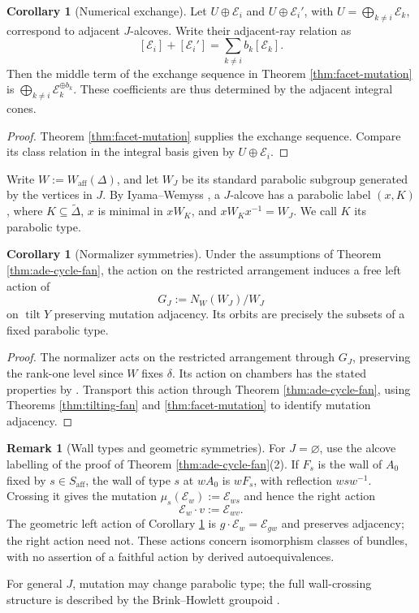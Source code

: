 \documentclass[a4paper,reqno]{amsart}
\def\E{\mathcal{E}}
\DeclareMathOperator{\tilt}{tilt}
\theoremstyle{definition}
\newtheorem{Cor}[Thm]{Corollary}
\newtheorem{Rem}[Thm]{Remark}
\begin{document}
\begin{Cor}[Numerical exchange]\label{cor:ade-numerical-exchange}
Let $U\oplus \E_i$ and $U\oplus \E_i'$, with $U=\bigoplus_{k\ne i}\E_k$, correspond to adjacent $J$-alcoves. Write their adjacent-ray relation as
\[
[\E_i]+[\E_i']=\sum_{k\ne i}b_k[\E_k].
\]
Then the middle term of the exchange sequence in Theorem \ref{thm:facet-mutation} is $\bigoplus_{k\ne i}\E_k^{\oplus b_k}$. These coefficients are thus determined by the adjacent integral cones.
\end{Cor}
\begin{proof}
Theorem \ref{thm:facet-mutation} supplies the exchange sequence. Compare its class relation in the integral basis given by $U\oplus\E_i$.
\end{proof}

Write $W:=W_{\mathrm{aff}}(\Delta)$, and let $W_J$ be its standard parabolic subgroup generated by the vertices in $J$. By Iyama--Wemyss \cite[Theorem 1.12 and Proposition 2.7]{IWTC}, a $J$-alcove has a parabolic label $(x,K)$, where $K\subseteq\widetilde\Delta$, $x$ is minimal in $xW_K$, and $xW_Kx^{-1}=W_J$. We call $K$ its parabolic type.

\begin{Cor}[Normalizer symmetries]\label{cor:ade-mutation-symmetries}
Under the assumptions of Theorem \ref{thm:ade-cycle-fan}, the action on the restricted arrangement induces a free left action of
\[
G_J:=N_W(W_J)/W_J
\]
on $\tilt Y$ preserving mutation adjacency. Its orbits are precisely the subsets of a fixed parabolic type.
\end{Cor}
\begin{proof}
The normalizer acts on the restricted arrangement through $G_J$, preserving the rank-one level since $W$ fixes $\delta$. Its action on chambers has the stated properties by \cite[Lemmas 3.23--3.24]{GHLY26}. Transport this action through Theorem \ref{thm:ade-cycle-fan}, using Theorems \ref{thm:tilting-fan} and \ref{thm:facet-mutation} to identify mutation adjacency.
\end{proof}

\begin{Rem}[Wall types and geometric symmetries]
For $J=\varnothing$, use the alcove labelling of the proof of Theorem \ref{thm:ade-cycle-fan}(2). If $F_s$ is the wall of $A_0$ fixed by $s\in S_{\mathrm{aff}}$, the wall of type $s$ at $wA_0$ is $wF_s$, with reflection $wsw^{-1}$. Crossing it gives the mutation $\mu_s(\E_w):=\E_{ws}$ and hence the right action
\[
\E_w\cdot v:=\E_{wv}.
\]
The geometric left action of Corollary \ref{cor:ade-mutation-symmetries} is $g\cdot\E_w=\E_{gw}$ and preserves adjacency; the right action need not. These actions concern isomorphism classes of bundles, with no assertion of a faithful action by derived autoequivalences.

For general $J$, mutation may change parabolic type; the full wall-crossing structure is described by the Brink--Howlett groupoid \cite[Theorem 4.7]{GHLY26}.
\end{Rem}
\end{document}
